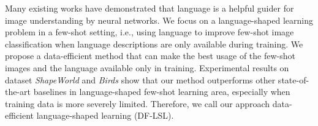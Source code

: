 Many existing works have demonstrated that language is a helpful guider for image understanding by neural networks. We focus on a language-shaped learning problem in a few-shot setting, i.e., using language to improve few-shot image classification when language descriptions are only available during training. We propose a data-efficient method that can make the best usage of the few-shot images and the language available only in training. Experimental results on dataset \textsl{ShapeWorld} and \textsl{Birds} show that our method outperforms other state-of-the-art baselines in language-shaped few-shot learning area, especially when training data is more severely limited. Therefore, we call our approach data-efficient language-shaped learning (DF-LSL).
